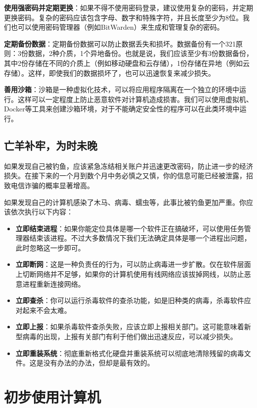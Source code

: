 \documentclass[../main.tex]{subfiles}
\begin{document}
\textbf{使用强密码并定期更换}：如果不得不使用密码登录，建议使用复杂的密码，并定期更换密码。复杂的密码应该包含字母、数字和特殊字符，并且长度至少为8位。我们也可以使用密码管理器（例如BitWarden）来生成和管理复杂的密码。

\textbf{定期备份数据}：定期备份数据可以防止数据丢失和损坏。数据备份有一个321原则：3份数据，2种介质，1个异地备份。也就是说，我们应该至少有3份数据备份，其中2份存储在不同的介质上（例如移动硬盘和云存储），1份存储在异地（例如云存储）。这样，即使我们的数据损坏了，也可以迅速恢复来减少损失。

\textbf{善用沙箱}：沙箱是一种虚拟化技术，可以将应用程序隔离在一个独立的环境中运行。这样可以一定程度上防止恶意软件对计算机造成损害。我们可以使用虚拟机、Docker等工具来创建沙箱环境，对于不能确定安全性的程序可以在此类环境中运行。

\subsection{亡羊补牢，为时未晚}

如果发现自己被钓鱼，应该紧急冻结相关账户并迅速更改密码，防止进一步的经济损失。在接下来的一个月到数个月中务必慎之又慎，你的信息可能已经被泄露，招致电信诈骗的概率显著增高。

如果发现自己的计算机感染了木马、病毒、蠕虫等，此事比被钓鱼更加严重。你应该依次执行以下内容：

\begin{itemize}
  \item \textbf{立即结束进程}：如果你能定位具体是哪一个软件正在搞破坏，可以使用任务管理器结束该进程。不过大多数情况下我们无法确定具体是哪一个进程出问题，此时忽略这一步即可。
  \item \textbf{立即断网}：这是一种负责任的行为，可以防止病毒进一步扩散。仅在软件层面上切断网络并不足够，如果你的计算机使用有线网络应该拔掉网线，以防止恶意进程重新连接网络。
  \item \textbf{立即查杀}：你可以运行杀毒软件的查杀功能，如是旧种类的病毒，杀毒软件应对起来不会太难。
  \item \textbf{立即上报}：如果杀毒软件查杀失败，应该立即上报相关部门。这可能意味着新型病毒的出现，上报有关部门有利于他们做出迅速反应，可以减少损失。
  \item \textbf{立即重装系统}：彻底重新格式化硬盘并重装系统可以彻底地清除残留的病毒文件。这是没有办法的办法，但却是最有效的。
\end{itemize}

\section{初步使用计算机}
\end{document}
